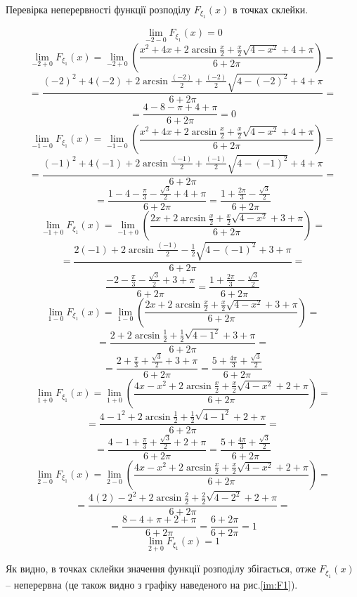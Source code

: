 \documentclass[14pt, a4paper, ukrainian]{extreport}
\begin{document}
	Перевірка неперервності функції розподілу $F_{\xi_1}(x)$ в точках склейки.
	
	$$
	\lim\limits_{-2-0}F_{\xi_1}(x) = 0$$
	$$\lim\limits_{-2+0}F_{\xi_1}(x) = \lim\limits_{-2+0}\left(\dfrac{x^2 + 4x + 2\arcsin{\frac{x}{2}} + \frac{x}{2}\sqrt{4-x^2} + 4 + \pi}{6+2\pi}\right) = $$
	$$ = \dfrac{(-2)^2 + 4(-2) + 2\arcsin{\frac{(-2)}{2}} + \frac{(-2)}{2}\sqrt{4-(-2)^2} + 4 + \pi}{6+2\pi} = $$
	$$ = \dfrac{4 - 8 - \pi + 4 + \pi}{6+2\pi} = 0
	$$
	$$\lim\limits_{-1-0}F_{\xi_1}(x) = \lim\limits_{-1-0} \left(\dfrac{x^2 + 4x + 2\arcsin{\frac{x}{2}} + \frac{x}{2}\sqrt{4-x^2} + 4 + \pi}{6+2\pi}\right) = $$
	$$ =\dfrac{(-1)^2 + 4(-1) + 2\arcsin{\frac{(-1)}{2}} + \frac{(-1)}{2}\sqrt{4-(-1)^2} + 4 + \pi}{6+2\pi} = 
	$$ 
	$$ = \dfrac{1 -4 - \frac{\pi}{3} - \frac{\sqrt{3}}{2} + 4 + \pi}{6+2\pi} = \dfrac{1 + \frac{2\pi}{3} - \frac{\sqrt{3}}{2}}{6+2\pi}
	$$
	$$\lim\limits_{-1+0}F_{\xi_1}(x) = 
	\lim\limits_{-1+0}\left(\dfrac{2x + 2\arcsin{\frac{x}{2}} + \frac{x}{2}\sqrt{4-x^2} + 3 + \pi}{6+2\pi}\right) = 
	$$
	$$= \dfrac{2(-1) + 2\arcsin{\frac{(-1)}{2}} - \frac{1}{2}\sqrt{4-(-1)^2} + 3 + \pi}{6+2\pi} = 
	$$
	$$ \dfrac{-2 -\frac{\pi}{3} - \frac{\sqrt{3}}{2} + 3 + \pi}{6+2\pi} = \dfrac{1  + \frac{2\pi}{3} - \frac{\sqrt{3}}{2}}{6+2\pi}
	$$
	$$ \lim\limits_{1-0}F_{\xi_1}(x) = 
	\lim\limits_{1-0}\left(\dfrac{2x + 2\arcsin{\frac{x}{2}} + \frac{x}{2}\sqrt{4-x^2} + 3 + \pi}{6+2\pi}\right) = 
	$$
	$$ = \dfrac{2 + 2\arcsin{\frac{1}{2}} + \frac{1}{2}\sqrt{4-1^2} + 3 + \pi}{6+2\pi} = 
	$$
	$$ = \dfrac{2 + \frac{\pi}{3} + \frac{\sqrt{3}}{2} + 3 + \pi}{6+2\pi} = \dfrac{5 + \frac{4\pi}{3} + \frac{\sqrt{3}}{2}}{6+2\pi}
	$$
	$$ \lim\limits_{1+0}F_{\xi_1}(x) = 
	\lim\limits_{1+0}\left(\dfrac{4x - x^2 + 2\arcsin{\frac{x}{2}} + \frac{x}{2}\sqrt{4-x^2}+  2 + \pi}{6+2\pi}\right) = 
	$$
	$$ = \dfrac{4 - 1^2 + 2\arcsin{\frac{1}{2}} + \frac{1}{2}\sqrt{4-1^2}+  2 + \pi}{6+2\pi} = 
	$$
	$$ = \dfrac{4 - 1 + \frac{\pi}{3} + \frac{\sqrt{3}}{2}+  2 + \pi}{6+2\pi} = \dfrac{5 + \frac{4\pi}{3} + \frac{\sqrt{3}}{2}}{6+2\pi}
	$$
	$$\lim\limits_{2-0}F_{\xi_1}(x) = 
	\lim\limits_{2-0}\left(\dfrac{4x - x^2 + 2\arcsin{\frac{x}{2}} + \frac{x}{2}\sqrt{4-x^2}+  2 + \pi}{6+2\pi}\right) = 
	$$
	$$ = \dfrac{4(2) - 2^2 + 2\arcsin{\frac{2}{2}} + \frac{2}{2}\sqrt{4-2^2} +  2 + \pi}{6+2\pi} =
	$$
	$$ = \dfrac{8 - 4 + \pi +  2 + \pi}{6+2\pi} = \dfrac{6 + 2\pi}{6+2\pi} = 1
	$$ 
	$$ \lim\limits_{2+0}F_{\xi_1}(x) = 1
	$$
	
	Як видно, в точках склейки значення функції розподілу збігається, отже $F_{\xi_1}(x)$ -- неперервна (це також видно з графіку наведеного на рис.\ref{im:F1}).
	
\end{document}
